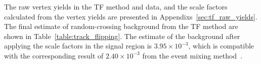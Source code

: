 %
%
%

The raw vertex yields in the TF method and data, and the scale factors calculated from the vertex yields are presented in Appendixs~\ref{sec:tf_raw_yields}. The final estimate of random-crossing background from the TF method are shown in Table~\ref{table:track_flipping}. The estimate of the background after applying the scale factors in the signal region is $3.95\times10^{-3}$, which is compatible with the corresponding result of $2.40\times 10^{-3}$ from the event mixing method~\cite{DuarteCampderros:2275055}.


